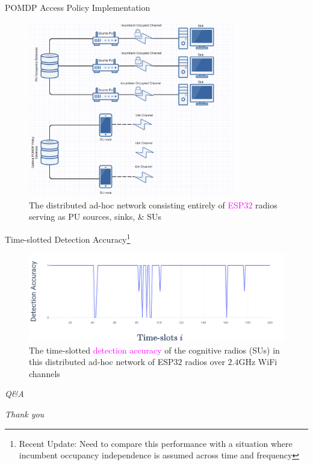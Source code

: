 \documentclass{beamer}
\begin{document}
\begin{frame}{POMDP Access Policy Implementation}
\begin{figure}
    \centering
    \includegraphics[width = 0.8\textwidth]{ESP32_Deployment.PNG}
    \caption{\scriptsize{The distributed ad-hoc network consisting entirely of \textcolor{magenta}{ESP$32$} radios serving as PU sources, sinks, \& SUs}}
    \label{fig:35}
\end{figure}
\end{frame}
\begin{frame}{Time-slotted Detection Accuracy\footnote{\tiny{Recent Update: Need to compare this performance with a situation where incumbent occupancy independence is assumed across time and frequency}}}
    \begin{figure}
    \centering
    \includegraphics[width = 1.0\textwidth]{ESP32.PNG}
    \caption{The time-slotted \textcolor{magenta}{detection accuracy} of the cognitive radios (SUs) in this distributed ad-hoc network of ESP$32$ radios over $2.4$GHz WiFi channels}
    \label{fig:36}
\end{figure}
\end{frame}
\begin{frame}{}
  \centering \Huge
  \emph{Q\&A}
\end{frame}
\begin{frame}{}
  \centering \Huge
  \emph{Thank you}
\end{frame}
\end{document}
